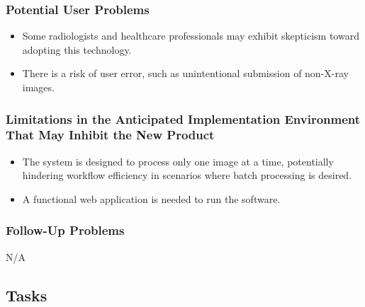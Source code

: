 \documentclass[12pt]{article}
\begin{document}
\subsubsection{Potential User Problems}
\begin{itemize}
    \item Some radiologists and healthcare professionals may exhibit skepticism toward adopting this technology.
    \item There is a risk of user error, such as unintentional submission of non-X-ray images. 
\end{itemize}
\subsubsection{Limitations in the Anticipated Implementation Environment That May
Inhibit the New Product}
\begin{itemize}
    \item The system is designed to process only one image at a time, potentially hindering workflow efficiency in scenarios where batch processing is desired. 
    \item A functional web application is needed to run the software. 
\end{itemize}
\subsubsection{Follow-Up Problems}
    N/A

\subsection{Tasks}
\end{document}

